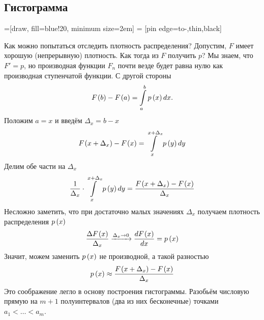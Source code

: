 \subsection{Гистограмма}
\label{subsection:histogram}
=[draw, fill=blue!20, minimum size=2em]
 = [pin edge={to-,thin,black}]

Как можно попытаться отследить плотность распределения?
Допустим, $F$ имеет хорошую (непрерывную) плотность.
Как тогда из $F$ получить $p$?
Мы знаем, что $F'=p$, но производная функции $F_n$ почти везде будет равна нулю
как производная ступенчатой функции.
С другой стороны
\begin{equation*}
  F_{}\left(b\right)-F_{}\left(a\right)= \int\limits_a^b p\left(x\right) dx.
\end{equation*}
Положим $a=x$ и введём $\Delta_x=b-x$
$$F_{}\left(x+ \Delta_x\right)-F_{}\left(x\right)= \int\limits_x^{x+ \Delta_x} p\left(y\right) dy$$
Делим обе части на $\Delta_x$
\begin{equation*}
  \frac{1}{\Delta_x}\cdot \int\limits_x^{x+ \Delta_x} p\left(y\right) dy
   = \frac{F_{}\left(x+ \Delta_x\right)-F_{}\left(x\right)}{\Delta_x}
\end{equation*}
Несложно заметить, что при достаточно малых значениях $\Delta_x$
получаем плотность распределения $p\left(x\right)$
\begin{equation*}
  \frac{\Delta F_{}\left(x\right)}{\Delta_x} \xrightarrow[]{\Delta_x\to 0}
    \frac{dF_{}\left(x\right)}{dx}
  = p\left(x\right)
\end{equation*}
Значит, можем заменить $p\left(x\right)$ не производной, а такой разностью
\begin{equation*}
  p\left(x\right)\approx\frac{F_{}\left(x+ \Delta_x\right)-F_{}\left(x\right)}{\Delta_x}
\end{equation*}
Это соображение легло в основу построения гистограммы.
Разобьём числовую прямую на $m+1$ полуинтервалов (два из них бесконечные)
точками $a_1 < \dots < a_m$.
\begin{comment}
Возьмём $m$ полуинтервалов на числовой прямой
$I_j= \left(a_{j-1},a_j\right], i= \overline{1,m}$
таких, каждое значение выборки попадает в свой интервал.
Для этого определим пару свойств точек, ограничивающих эти интервалы:
\begin{enumerate}
  \item Каждая следующая точка строго правее (больше) предыдущей
    (так как зачем нам одинаковые точки?)
    $$a_0<a_1<\dots<a_m$$
  \item Каждое значение выборки должно попадать ровно в один полуинтервал.
    Очевидно, что данные полуинтервалы $I_j$ не пересекаются между собой.
    Значит, осталось потребовать, чтобы
    крайнее левое значение было меньше минимального значения из выборки,
    а крайнее правое --- не меньше максимального
    $$a_0<min\left(X\right)\le max\left(X\right)\le a_m$$
\end{enumerate}

Введём функцию $q\left(y\right)$
$$q\left(y\right)
= \sum_{j=1}^m \frac{\cdf{a_j}-\cdf{a_{j-1}}}{a_j-a_{j-1}}
  \cdot \indicator{y\in I_j}$$
\end{comment}
